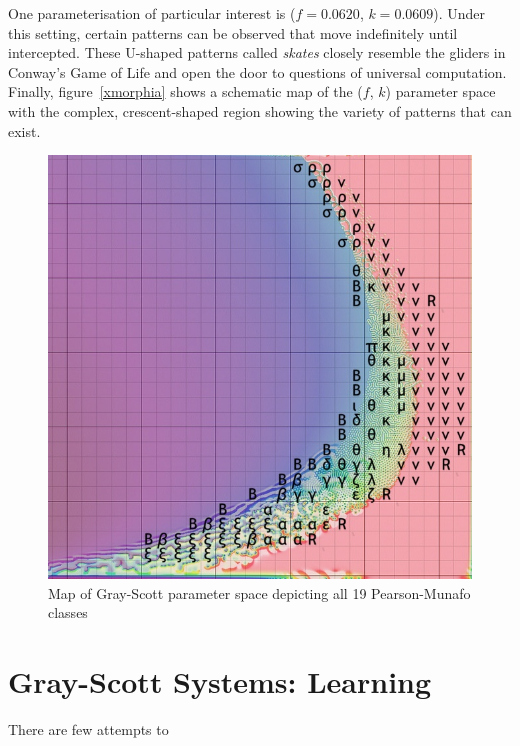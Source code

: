 One parameterisation of particular interest is ($f=0.0620$, $k=0.0609$). Under this setting, certain patterns can be observed that move indefinitely until intercepted. These U-shaped patterns called \textit{skates} closely resemble the gliders in Conway's Game of Life and open the door to questions of universal computation. Finally, figure~\ref{xmorphia} shows a schematic map of the ($f$, $k$) parameter space with the complex, crescent-shaped region showing the variety of patterns that can exist.\\

\begin{figure}[!h]
\centering
\includegraphics[width=.9\textwidth]{images/munafo/xmorphia.jpg}
\caption{Map of Gray-Scott parameter space depicting all 19 Pearson-Munafo classes \cite{xmorphia}}
\label{fig:xmorphia}
\end{figure}

\section{Gray-Scott Systems: Learning}

There are few attempts to 

